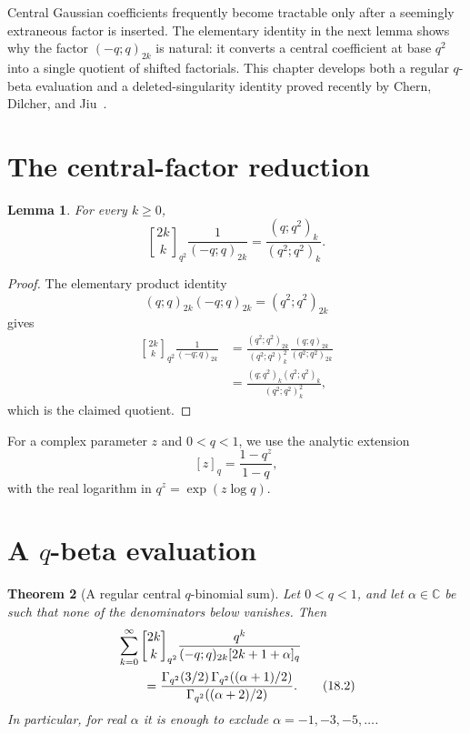 \documentclass[11pt,oneside,openany]{book}
\newtheorem{theorem}{Theorem}[chapter]
\newtheorem{lemma}[theorem]{Lemma}
\theoremstyle{definition}
\theoremstyle{remark}
\newcommand{\Qbinom}[3]{\genfrac{[}{]}{0pt}{}{#1}{#2}_{#3}}
\newcommand{\C}{\mathbb C}
\begin{document}
Central Gaussian coefficients frequently become tractable only after a seemingly extraneous factor is inserted.  The elementary identity in the next lemma shows why the factor $(-q;q)_{2k}$ is natural: it converts a central coefficient at base $q^2$ into a single quotient of shifted factorials.  This chapter develops both a regular $q$-beta evaluation and a deleted-singularity identity proved recently by Chern, Dilcher, and Jiu~\cite{ChernDilcherJiu2026}.

\section{The central-factor reduction}

\begin{lemma}\label{lem:central-reduction}
For every $k\ge0$,
\[
 \Qbinom{2k}{k}{q^2}\frac1{(-q;q)_{2k}}
 =\frac{(q;q^2)_k}{(q^2;q^2)_k}.
 \tag{18.1}\label{eq:central-reduction}
\]
\end{lemma}

\begin{proof}
The elementary product identity
\[
 (q;q)_{2k}(-q;q)_{2k}=(q^2;q^2)_{2k}
\]
gives
\begin{align*}
 \Qbinom{2k}{k}{q^2}\frac1{(-q;q)_{2k}}
 &=\frac{(q^2;q^2)_{2k}}{(q^2;q^2)_k^2}
   \frac{(q;q)_{2k}}{(q^2;q^2)_{2k}}\\
 &=\frac{(q;q^2)_k(q^2;q^2)_k}{(q^2;q^2)_k^2},
\end{align*}
which is the claimed quotient.
\end{proof}

For a complex parameter $z$ and $0<q<1$, we use the analytic extension
\[
 [z]_q=\frac{1-q^z}{1-q},
\]
with the real logarithm in $q^z=\exp(z\log q)$.

\section{A \texorpdfstring{$q$}{q}-beta evaluation}

\begin{theorem}[A regular central $q$-binomial sum]\label{thm:regular-central-sum}
Let $0<q<1$, and let $\alpha\in\C$ be such that none of the denominators below vanishes.  Then
\begin{align}
 &\sum_{k=0}^{\infty}
 \Qbinom{2k}{k}{q^2}
 \frac{q^k}{(-q;q)_{2k}[2k+1+\alpha]_q}
 \notag\\
 &\qquad=
 \frac{\Gamma_{q^2}(3/2)\,
       \Gamma_{q^2}((\alpha+1)/2)}
      {\Gamma_{q^2}((\alpha+2)/2)}.
 \tag{18.2}\label{eq:regular-central-sum}
\end{align}
In particular, for real $\alpha$ it is enough to exclude
$\alpha=-1,-3,-5,\ldots$.
\end{theorem}
\end{document}
